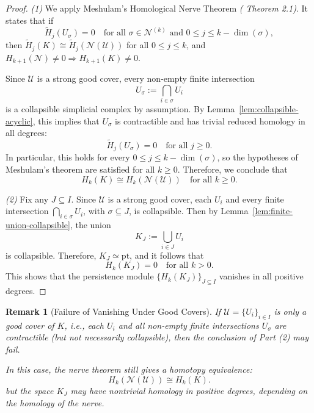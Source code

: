 \documentclass[12pt,a4paper,twoside, reqno, tbtags]{article}
\numberwithin{equation}{section}
\newtheorem{remark}{Remark}[section]
\begin{document}
\begin{proof}
\textit{(1)} We apply Meshulam's Homological Nerve Theorem \emph{(\cite{Meshulam} Theorem 2.1)}. It states that if
\[
\widetilde{H}_j(U_\sigma) = 0 \quad \text{for all } \sigma \in \mathcal{N}^{(k)} \text{ and } 0 \leq j \leq k - \dim(\sigma),
\]
then \( \widetilde{H}_j(K) \cong \widetilde{H}_j(\mathcal{N}(\mathcal{U})) \) for all \( 0 \leq j \leq k \), and \( H_{k+1}(\mathcal{N}) \neq 0 \Rightarrow H_{k+1}(K) \neq 0 \).

Since \( \mathcal{U} \) is a strong good cover, every non-empty finite intersection
\[
U_\sigma := \bigcap_{i \in \sigma} U_i
\]
is a collapsible simplicial complex by assumption. By Lemma~\ref{lem:collapsible-acyclic}, this implies that \( U_\sigma \) is contractible and has trivial reduced homology in all degrees:
\[
\widetilde{H}_j(U_\sigma) = 0 \quad \text{for all } j \geq 0.
\]
In particular, this holds for every \( 0 \leq j \leq k - \dim(\sigma) \), so the hypotheses of Meshulam’s theorem are satisfied for all \( k \geq 0 \). Therefore, we conclude that
\[
H_k(K) \cong H_k(\mathcal{N}(\mathcal{U})) \quad \text{for all } k \geq 0.
\]

\textit{(2)} Fix any \( J \subseteq I \). Since \( \mathcal{U} \) is a strong good cover, each \( U_i \) and every finite intersection \( \bigcap_{i \in \sigma} U_i \), with \( \sigma \subseteq J \), is collapsible. Then by Lemma~\ref{lem:finite-union-collapsible}, the union
\[
K_J := \bigcup_{i \in J} U_i
\]
is collapsible. Therefore, \( K_J \simeq \mathrm{pt} \), and it follows that
\[
H_k(K_J) = 0 \quad \text{for all } k > 0.
\]
This shows that the persistence module \( \{H_k(K_J)\}_{J \subseteq I} \) vanishes in all positive degrees.
\end{proof}

\begin{remark}[Failure of Vanishing Under Good Covers]
If \( \mathcal{U} = \{U_i\}_{i \in I} \) is only a \emph{good cover} of \( K \), i.e., each \( U_i \) and all non-empty finite intersections \( U_\sigma \) are \emph{contractible} (but not necessarily collapsible), then the conclusion of Part (2) may fail.

In this case, the nerve theorem still gives a homotopy equivalence:
\[
H_k(\mathcal{N}(\mathcal{U})) \cong H_k(K).
\]
but the space \( K_J \) may have nontrivial homology in positive degrees, depending on the homology of the nerve.
\end{remark}
\end{document}
